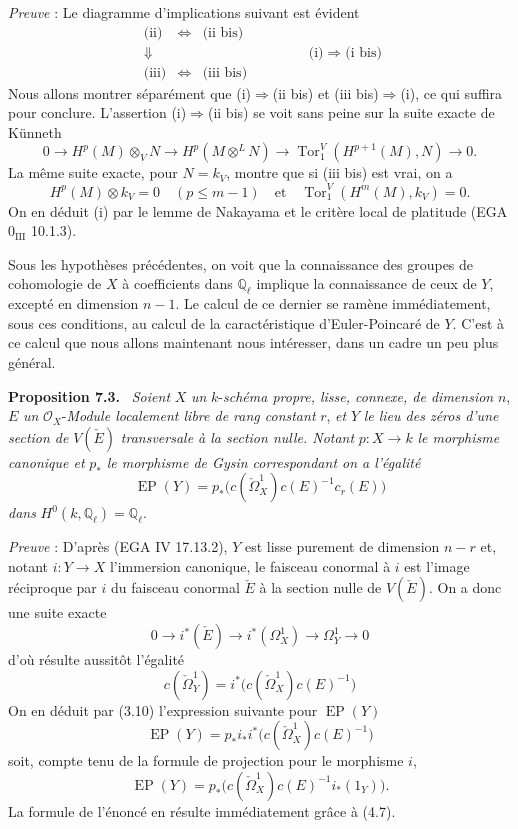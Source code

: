 \documentclass[11pt]{article}
\newenvironment{statement}[1]{\par\medskip\noindent\textbf{#1.}\ }{\par\medskip}
\begin{document}
\emph{Preuve} : Le diagramme d'implications suivant est évident
\[
\begin{array}{ccc}
\text{(ii)}&\Leftrightarrow&\text{(ii bis)}\\
\Downarrow&&\\
\text{(iii)}&\Leftrightarrow&\text{(iii bis)}
\end{array}
\qquad\qquad
\text{(i)}\Rightarrow\text{(i bis)}
\]
Nous allons montrer séparément que (i)$\Rightarrow$(ii bis) et (iii bis)$\Rightarrow$(i), ce qui suffira pour conclure. L'assertion (i)$\Rightarrow$(ii bis) se voit sans peine sur la suite exacte de Künneth
\[
0\to H^p(M)\otimes_V N\to H^p(M\otimes^L N)\to \operatorname{Tor}_1^V(H^{p+1}(M),N)\to0.
\]
La même suite exacte, pour $N=k_V$, montre que si (iii bis) est vrai, on a
\[
H^p(M)\otimes k_V=0\quad(p\le m-1)\quad\text{et}\quad
\operatorname{Tor}_1^V(H^m(M),k_V)=0.
\]
On en
déduit (i) par le lemme de Nakayama et le critère local de platitude (EGA $0_{\mathrm{III}}$ 10.1.3).

Sous les hypothèses précédentes, on voit que la connaissance des groupes de cohomologie de $X$ à coefficients dans $\mathbb Q_\ell$ implique la connaissance de ceux de $Y$, excepté en dimension $n-1$. Le calcul de ce dernier se ramène immédiatement, sous ces conditions, au calcul de la caractéristique d'Euler-Poincaré de $Y$. C'est à ce calcul que nous allons maintenant nous intéresser, dans un cadre un peu plus général.

\begin{statement}{Proposition 7.3}
\emph{Soient} $X$ \emph{un} $k$-\emph{schéma propre, lisse, connexe, de dimension} $n$, $E$ \emph{un} $\mathcal O_X$-\emph{Module localement libre de rang constant} $r$, \emph{et} $Y$ \emph{le lieu des zéros d'une section de} $V(\check E)$ \emph{transversale à la section nulle. Notant} $p:X\to k$ \emph{le morphisme canonique et} $p_*$ \emph{le morphisme de Gysin correspondant on a l'égalité}
\[
\operatorname{EP}(Y)=p_*\bigl(c(\check\Omega_X^1)c(E)^{-1}c_r(E)\bigr)
\]
\emph{dans} $H^0(k,\mathbb Q_\ell)=\mathbb Q_\ell$.
\end{statement}

\emph{Preuve} : D'après (EGA IV 17.13.2), $Y$ est lisse purement de dimension $n-r$ et, notant $i:Y\to X$ l'immersion canonique, le faisceau conormal à $i$ est l'image réciproque par $i$ du faisceau conormal $\check E$ à la section nulle de $V(\check E)$. On a donc une suite exacte
\[
0\to i^*(\check E)\to i^*(\Omega_X^1)\to\Omega_Y^1\to0
\tag{7.3.1}
\]
d'où résulte aussitôt l'égalité
\[
c(\check\Omega_Y^1)=i^*\bigl(c(\check\Omega_X^1)c(E)^{-1}\bigr)
\tag{7.3.2}
\]
On en déduit par (3.10) l'expression suivante pour $\operatorname{EP}(Y)$
\[
\operatorname{EP}(Y)=p_*i_*i^*\bigl(c(\check\Omega_X^1)c(E)^{-1}\bigr)
\]
soit, compte tenu de la formule de projection pour le morphisme $i$,
\[
\operatorname{EP}(Y)=p_*\bigl(c(\check\Omega_X^1)c(E)^{-1}i_*(1_Y)\bigr).
\]
La formule de l'énoncé en résulte immédiatement grâce à (4.7).
\end{document}
